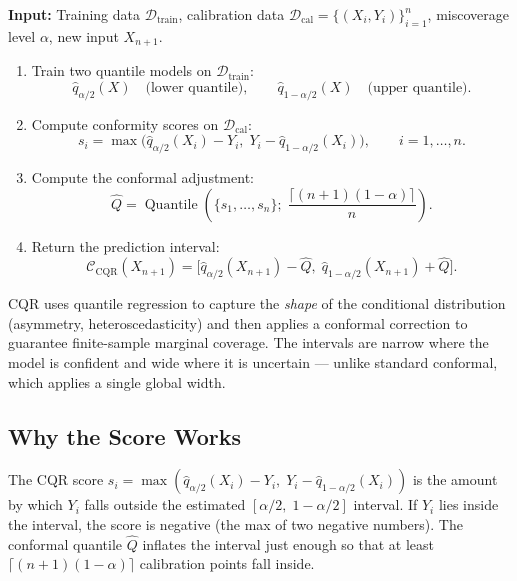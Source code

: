 \documentclass[11pt, a4paper]{article}
\theoremstyle{definition}
\theoremstyle{plain}
\theoremstyle{remark}
\newcommand{\Ccal}{\mathcal{C}}
\newcommand{\Dcal}{\mathcal{D}}
\DeclareMathOperator{\Quantile}{Quantile}
\begin{document}
\begin{algorithmbox}[title={Algorithm 2: Conformalized Quantile Regression (CQR)}]
\label{alg:cqr}
\textbf{Input:} Training data $\Dcal_{\mathrm{train}}$, calibration data
$\Dcal_{\mathrm{cal}} = \{(X_i, Y_i)\}_{i=1}^{n}$,
miscoverage level $\alpha$, new input $X_{n+1}$.
\begin{enumerate}
    \item Train two quantile models on $\Dcal_{\mathrm{train}}$:
    \[
        \hat{q}_{\alpha/2}(X) \quad \text{(lower quantile)}, \qquad
        \hat{q}_{1-\alpha/2}(X) \quad \text{(upper quantile)}.
    \]
    \item Compute conformity scores on $\Dcal_{\mathrm{cal}}$:
    \[
        s_i = \max\!\bigl(\hat{q}_{\alpha/2}(X_i) - Y_i,\;
              Y_i - \hat{q}_{1-\alpha/2}(X_i)\bigr), \qquad i = 1, \ldots, n.
    \]
    \item Compute the conformal adjustment:
    \[
        \hat{Q} = \Quantile\!\left(\{s_1, \ldots, s_n\};\;
        \frac{\lceil (n+1)(1-\alpha) \rceil}{n}\right).
    \]
    \item Return the prediction interval:
    \[
        \Ccal_{\mathrm{CQR}}(X_{n+1}) = \bigl[\hat{q}_{\alpha/2}(X_{n+1}) - \hat{Q},\;
        \hat{q}_{1-\alpha/2}(X_{n+1}) + \hat{Q}\bigr].
    \]
\end{enumerate}
\end{algorithmbox}

\begin{keyidea}
CQR uses quantile regression to capture the \emph{shape} of the conditional
distribution (asymmetry, heteroscedasticity) and then applies a conformal
correction to guarantee finite-sample marginal coverage.
The intervals are narrow where the model is confident and wide where it is
uncertain --- unlike standard conformal, which applies a single global width.
\end{keyidea}

\subsection{Why the Score Works}

The CQR score $s_i = \max(\hat{q}_{\alpha/2}(X_i) - Y_i,\;
Y_i - \hat{q}_{1-\alpha/2}(X_i))$ is the amount by which $Y_i$ falls outside
the estimated $[{\alpha}/{2},\; 1 - {\alpha}/{2}]$ interval.
If $Y_i$ lies inside the interval, the score is negative (the max of two negative
numbers).
The conformal quantile $\hat{Q}$ inflates the interval just enough so that
at least $\lceil (n+1)(1 - \alpha) \rceil$ calibration points fall inside.
\end{document}
